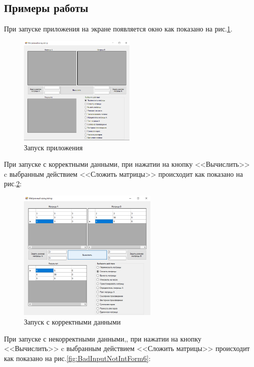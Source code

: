 \subsection{Примеры работы}

При запуске приложения на экране появляется окно как показано на рис.\ref{fig:StartForm6}.

\newpage

\begin{figure}[!h]
    \centering
    \includegraphics[width = 0.5\textwidth]{images/Task6/Start.png}
    \caption{Запуск приложения}
    \label{fig:StartForm6}
\end{figure}

При запуске с корректными данными, при нажатии на кнопку <<Вычислить>> c выбранным действием <<Сложить матрицы>> происходит как показано на рис.\ref{fig:WorkForm6}:

\begin{figure}[!h]
    \centering
    \includegraphics[width = 0.6\textwidth]{images/Task6/WorkSum.png}
    \caption{Запуск с корректными данными}
    \label{fig:WorkForm6}
\end{figure}

При запуске с некорректными данными,, при нажатии на кнопку <<Вычислить>> c выбранным действием <<Сложить матрицы>> происходит как показано на рис.\ref{fig:BadInputNotIntForm6}:

